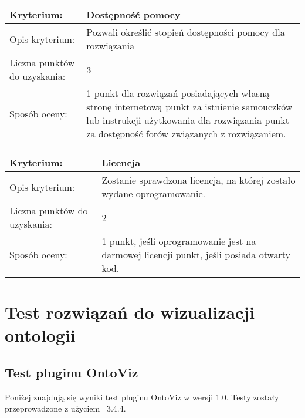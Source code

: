 \begin{longtable}{|m{3cm}|m{10cm}|}\hline
Kryterium:                   & \bf{ Dostępność pomocy }\\ \hline
Opis kryterium:              &  Pozwali określić stopień dostępności pomocy dla rozwiązania   \\ \hline
Liczna punktów do uzyskania: &  3   \\ \hline
Sposób oceny:                &  1 punkt dla rozwiązań posiadających własną stronę internetową \newline
                                1 punkt za istnienie samouczków lub instrukcji użytkowania dla rozwiązania  \newline
                                1 punkt za dostępność forów  związanych z rozwiązaniem. \\ \hline
\end{longtable}

\begin{longtable}{|m{3cm}|m{10cm}|}\hline
Kryterium:                   & \bf{ Licencja }\\ \hline
Opis kryterium:              &  Zostanie sprawdzona licencja, na której zostało wydane oprogramowanie.  \\ \hline
Liczna punktów do uzyskania: &   2  \\ \hline
Sposób oceny:                &   1 punkt, jeśli oprogramowanie jest na darmowej licencji\newline
                                 1 punkt, jeśli posiada otwarty kod. \\ \hline
\end{longtable}


\section{Test rozwiązań do wizualizacji ontologii}

\subsection*{Test pluginu OntoViz}

Poniżej znajdują się wyniki test pluginu OntoViz w wersji 1.0. Testy zostały przeprowadzone z użyciem \proteges~3.4.4.

